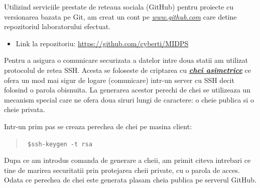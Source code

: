 Utilizind serviciile prestate de reteaua sociala (GitHub) pentru proiecte cu versionarea bazata pe Git, am creat un cont pe \emph{\url{www.github.com}} care detine repozitoriul laboratorului efectuat.

\newcommand*{\authorimg}[1]{%
	\raisebox{-.3\baselineskip}{%
		\texttt{[image: \#1]}%
	}%
}
\begin{itemize}
	\item[\authorimg{img/1.png}]
	\begin{center}
		Link la repozitoriu: \url{https://github.com/cyberti/MIDPS}
	\end{center}
\end{itemize}


Pentru a asigura o comunicare securizata a datelor intre doua statii am utilizat protocolul de retea SSH. Acesta se foloseste de criptarea cu \emph{\textbf{\href{https://en.wikipedia.org/wiki/Public-key_cryptography}{chei asimetrice}}} ce ofera un mod mai sigur de logare (comunicare) intr-un server cu SSH decit folosind o parola obisnuita. La generarea acestor perechi de chei se utilizeaza un mecanism special care ne ofera doua siruri lungi de caractere: o cheie publica si o cheie privata.

Intr-un prim pas se creaza perechea de chei pe masina client:
\begin{quote}\tt
	\$ssh-keygen -t rsa \hfill
\end{quote}


Dupa ce am introdus comanda de generare a cheii, am primit citeva intrebari ce tine de marirea securitatii prin protejarea cheii private, cu o parola de acces. Odata ce perechea de chei este generata plasam cheia publica pe serverul GitHub.

